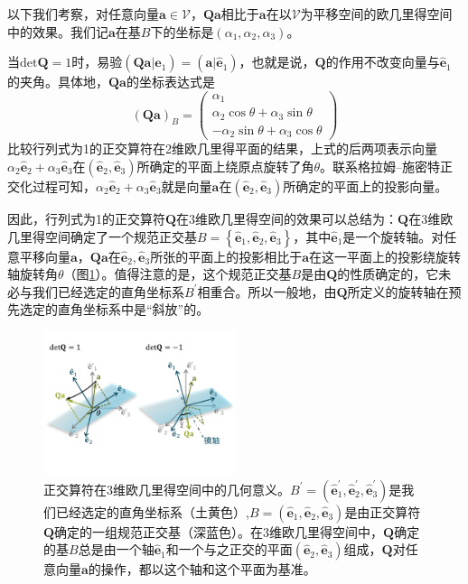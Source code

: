 \documentclass[../main.tex]{subfiles}
\begin{document}
以下我们考察，对任意向量$\mathbf{a}\in\mathcal{V}$，$\mathbf{Qa}$相比于$\mathbf{a}$在以$\mathcal{V}$为平移空间的欧几里得空间中的效果。我们记$\mathbf{a}$在基$B$下的坐标是$\left(\alpha_1,\alpha_2,\alpha_3\right)$。

当$\mathrm{det}\mathbf{Q}=1$时，易验$\left(\mathbf{Qa}|\mathbf{\hat{e}}_1\right)=\left(\mathbf{a}|\mathbf{\hat{e}}_1\right)$，也就是说，$\mathbf{Q}$的作用不改变向量与$\mathbf{\hat{e}}_1$的夹角。具体地，$\mathbf{Qa}$的坐标表达式是
\[\left(\mathbf{Qa}\right)_B=\left(\begin{array}{c}\alpha_1\\\alpha_2\cos\theta+\alpha_3\sin\theta\\-\alpha_2\sin\theta+\alpha_3\cos\theta\end{array}\right)\]
比较行列式为1的正交算符在2维欧几里得平面的结果，上式的后两项表示向量$\alpha_2\mathbf{\hat{e}}_2+\alpha_3\mathbf{\hat{e}}_3$在$\left(\mathbf{\hat{e}}_2,\mathbf{\hat{e}}_3\right)$所确定的平面上绕原点旋转了角$\theta$。联系格拉姆--施密特正交化过程可知，$\alpha_2\mathbf{\hat{e}}_2+\alpha_3\mathbf{\hat{e}}_3$就是向量$\mathbf{a}$在$\left(\mathbf{\hat{e}}_2,\mathbf{\hat{e}}_3\right)$所确定的平面上的投影向量。

因此，行列式为1的正交算符$\mathbf{Q}$在3维欧几里得空间的效果可以总结为：$\mathbf{Q}$在3维欧几里得空间确定了一个规范正交基$B=\left\{\mathbf{\hat{e}}_1,\mathbf{\hat{e}}_2,\mathbf{\hat{e}}_3\right\}$，其中$\mathbf{\hat{e}}_1$是一个旋转轴。对任意平移向量$\mathbf{a}$，$\mathbf{Qa}$在$\mathbf{\hat{e}}_2,\mathbf{\hat{e}}_3$所张的平面上的投影相比于$\mathbf{a}$在这一平面上的投影绕旋转轴旋转角$\theta$（图\ref{fig:II.3.2}）。值得注意的是，这个规范正交基$B$是由$\mathbf{Q}$的性质确定的，它未必与我们已经选定的直角坐标系$B^\prime$相重合。所以一般地，由$\mathbf{Q}$所定义的旋转轴在预先选定的直角坐标系中是“斜放”的。

\begin{figure}[ht]
    \centering
    \includegraphics[width=0.5\textwidth]{images/II.3.2.pdf}
    \caption{正交算符在3维欧几里得空间中的几何意义。$B^\prime=\left(\mathbf{\hat{e}}^\prime_1,\mathbf{\hat{e}}^\prime_2,\mathbf{\hat{e}}^\prime_3\right)$是我们已经选定的直角坐标系（土黄色）,$B=\left(\mathbf{\hat{e}}_1,\mathbf{\hat{e}}_2,\mathbf{\hat{e}}_3\right)$是由正交算符$\mathbf{Q}$确定的一组规范正交基（深蓝色）。在3维欧几里得空间中，$\mathbf{Q}$确定的基$B$总是由一个轴$\mathbf{\hat{e}}_1$和一个与之正交的平面$\left(\mathbf{\hat{e}}_2,\mathbf{\hat{e}}_3\right)$组成，$\mathbf{Q}$对任意向量$\mathbf{a}$的操作，都以这个轴和这个平面为基准。}
    \label{fig:II.3.2}
\end{figure}
\end{document}
